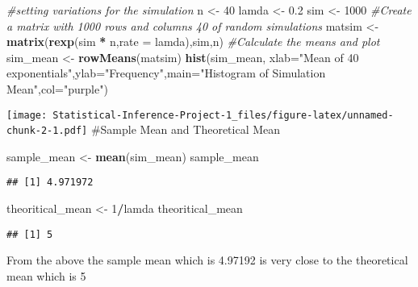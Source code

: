\documentclass[
]{article}
\newenvironment{Shaded}{\begin{snugshade}}{\end{snugshade}}
\newcommand{\AttributeTok}[1]{\textcolor[rgb]{0.13,0.29,0.53}{#1}}
\newcommand{\CommentTok}[1]{\textcolor[rgb]{0.56,0.35,0.01}{\textit{#1}}}
\newcommand{\DecValTok}[1]{\textcolor[rgb]{0.00,0.00,0.81}{#1}}
\newcommand{\FloatTok}[1]{\textcolor[rgb]{0.00,0.00,0.81}{#1}}
\newcommand{\FunctionTok}[1]{\textcolor[rgb]{0.13,0.29,0.53}{\textbf{#1}}}
\newcommand{\NormalTok}[1]{#1}
\newcommand{\OtherTok}[1]{\textcolor[rgb]{0.56,0.35,0.01}{#1}}
\newcommand{\SpecialCharTok}[1]{\textcolor[rgb]{0.81,0.36,0.00}{\textbf{#1}}}
\newcommand{\StringTok}[1]{\textcolor[rgb]{0.31,0.60,0.02}{#1}}
\begin{document}
\begin{Shaded}
\begin{Highlighting}[]
\CommentTok{\#setting variations for the simulation}
\NormalTok{n }\OtherTok{\textless{}{-}} \DecValTok{40}
\NormalTok{lamda }\OtherTok{\textless{}{-}} \FloatTok{0.2}
\NormalTok{sim }\OtherTok{\textless{}{-}} \DecValTok{1000}
\CommentTok{\#Create a matrix with 1000 rows and columns 40 of random simulations}
\NormalTok{matsim }\OtherTok{\textless{}{-}} \FunctionTok{matrix}\NormalTok{(}\FunctionTok{rexp}\NormalTok{(sim }\SpecialCharTok{*}\NormalTok{ n,}\AttributeTok{rate =}\NormalTok{ lamda),sim,n)}
\CommentTok{\#Calculate the means and plot}
\NormalTok{sim\_mean }\OtherTok{\textless{}{-}} \FunctionTok{rowMeans}\NormalTok{(matsim)}
\FunctionTok{hist}\NormalTok{(sim\_mean, }\AttributeTok{xlab=}\StringTok{"Mean of 40 exponentials"}\NormalTok{,}\AttributeTok{ylab=}\StringTok{"Frequency"}\NormalTok{,}\AttributeTok{main=}\StringTok{"Histogram of Simulation Mean"}\NormalTok{,}\AttributeTok{col=}\StringTok{"purple"}\NormalTok{)}
\end{Highlighting}
\end{Shaded}

\texttt{[image: Statistical-Inference-Project-1\_files/figure-latex/unnamed-chunk-2-1.pdf]}
\#Sample Mean and Theoretical Mean

\begin{Shaded}
\begin{Highlighting}[]
\NormalTok{sample\_mean }\OtherTok{\textless{}{-}} \FunctionTok{mean}\NormalTok{(sim\_mean)}
\NormalTok{sample\_mean}
\end{Highlighting}
\end{Shaded}

\begin{verbatim}
## [1] 4.971972
\end{verbatim}

\begin{Shaded}
\begin{Highlighting}[]
\NormalTok{theoritical\_mean }\OtherTok{\textless{}{-}} \DecValTok{1}\SpecialCharTok{/}\NormalTok{lamda}
\NormalTok{theoritical\_mean}
\end{Highlighting}
\end{Shaded}

\begin{verbatim}
## [1] 5
\end{verbatim}

From the above the sample mean which is 4.97192 is very close to the
theoretical mean which is 5
\end{document}
